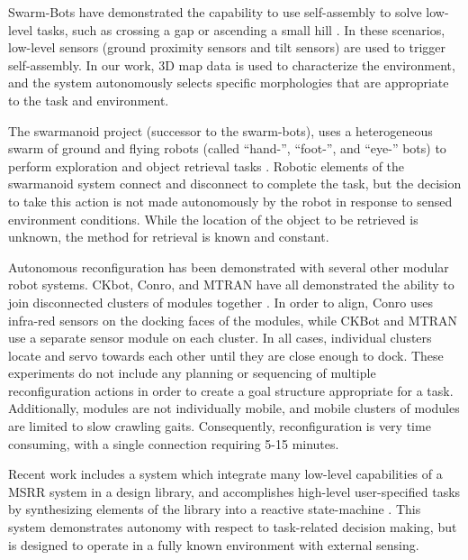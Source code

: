 \documentclass[conference]{IEEEtran}
\begin{document}
Swarm-Bots have demonstrated the capability to use self-assembly to solve low-level tasks, such as crossing a gap \cite{Mondada2004} or ascending a small hill \cite{OGrady2005}.  In these scenarios, low-level sensors (ground proximity sensors and tilt sensors) are used to trigger self-assembly.  In our work, 3D map data is used to characterize the environment, and the system autonomously selects specific morphologies that are appropriate to the task and environment. 

The swarmanoid project (successor to the swarm-bots), uses a heterogeneous swarm of ground and flying robots (called ``hand-'', ``foot-'', and ``eye-'' bots) to perform exploration and object retrieval tasks  \cite{Dorigo2013}. Robotic elements of the swarmanoid system connect and disconnect to complete the task, but the decision to take this action is not made autonomously by the robot in response to sensed environment conditions. While the location of the object to be retrieved is unknown, the method for retrieval is known and constant.

Autonomous reconfiguration has been demonstrated with several other modular robot systems. CKbot, Conro, and MTRAN have all demonstrated the ability to join disconnected clusters of modules together \cite{Yim2007, Rubenstein2004,Murata2006}. In order to align, Conro uses infra-red sensors on the docking faces of the modules, while CKBot and MTRAN use a separate sensor module on each cluster.  In all cases, individual clusters locate and servo towards each other until they are close enough to dock. These experiments do not include any planning or sequencing of multiple reconfiguration actions in order to create a goal structure appropriate for a task.  Additionally,  modules are not individually mobile, and mobile clusters of modules are limited to slow crawling gaits.  Consequently, reconfiguration is very time consuming, with a single connection requiring 5-15 minutes.


Recent work includes a system which integrate many low-level capabilities of a MSRR system in a design library, and accomplishes high-level user-specified tasks by synthesizing elements of the library into a reactive state-machine \cite{Jing2016}. This system demonstrates autonomy with respect to task-related decision making, but is designed to operate in a fully known environment with external sensing.
\end{document}
